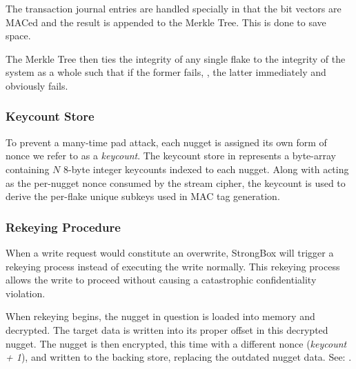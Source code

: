 The transaction journal entries are handled specially in that the bit
vectors are MACed and the result is appended to the Merkle Tree. This is done to
save space.

The Merkle Tree then ties the integrity of any single flake to the integrity of
the system as a whole such that if the former fails, , the latter immediately and obviously fails.

\subsubsection{Keycount Store}

To prevent a many-time pad attack, each nugget is assigned its own
form of nonce we refer to as a \emph{keycount}. The keycount store in
 represents a byte-array containing $N$ 8-byte
integer keycounts indexed to each nugget. Along with acting as the
per-nugget nonce consumed by the stream cipher, the keycount is used
to derive the per-flake unique subkeys used in MAC tag generation.

\subsubsection{Rekeying Procedure}

When a write request would constitute an overwrite, StrongBox will
trigger a rekeying process instead of executing the write normally.
This rekeying process allows the write to proceed without causing a
catastrophic confidentiality violation.

When rekeying begins, the nugget in question is loaded into memory and
decrypted. The target data is written into its proper offset in this decrypted
nugget. The nugget is then encrypted, this time with a different nonce
(\textit{keycount + 1}), and written to the backing store, replacing the
outdated nugget data. See: .

